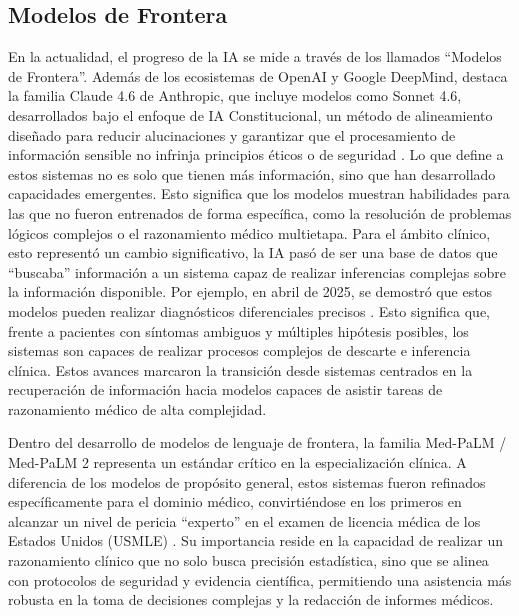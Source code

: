 \documentclass[10pt,a4paper]{article}
\begin{document}
\subsection{Modelos de Frontera}
En la actualidad, el progreso de la IA se mide a través de los llamados ``Modelos de Frontera''. Además de los ecosistemas de OpenAI y Google DeepMind, destaca la familia Claude 4.6 de Anthropic, que incluye modelos como Sonnet 4.6, desarrollados bajo el enfoque de IA Constitucional, un método de alineamiento diseñado para reducir alucinaciones y garantizar que el procesamiento de información sensible no infrinja principios éticos o de seguridad \cite{constitutional}. Lo que define a estos sistemas no es solo que tienen más información, sino que han desarrollado capacidades emergentes. Esto significa que los modelos muestran habilidades para las que no fueron entrenados de forma específica, como la resolución de problemas lógicos complejos o el razonamiento médico multietapa. Para el ámbito clínico, esto representó un cambio significativo, la IA pasó de ser una base de datos que ``buscaba'' información a un sistema capaz de realizar inferencias complejas sobre la información disponible. Por ejemplo, en abril de 2025, se demostró que estos modelos pueden realizar diagnósticos diferenciales precisos \cite{differential}. Esto significa que, frente a pacientes con síntomas ambiguos y múltiples hipótesis posibles, los sistemas son capaces de realizar procesos complejos de descarte e inferencia clínica. Estos avances marcaron la transición desde sistemas centrados en la recuperación de información hacia modelos capaces de asistir tareas de razonamiento médico de alta complejidad.


Dentro del desarrollo de modelos de lenguaje de frontera, la familia Med-PaLM / Med-PaLM 2 representa un estándar crítico en la especialización clínica. A diferencia de los modelos de propósito general, estos sistemas fueron refinados específicamente para el dominio médico, convirtiéndose en los primeros en alcanzar un nivel de pericia ``experto'' en el examen de licencia médica de los Estados Unidos (USMLE) \cite{med-palm}. Su importancia reside en la capacidad de realizar un razonamiento clínico que no solo busca precisión estadística, sino que se alinea con protocolos de seguridad y evidencia científica, permitiendo una asistencia más robusta en la toma de decisiones complejas y la redacción de informes médicos.
\end{document}
